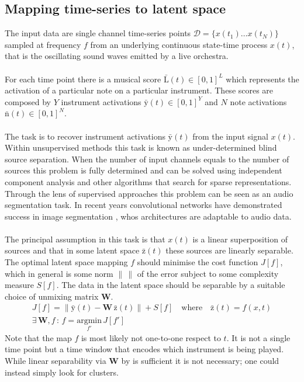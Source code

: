 \documentclass{article}[12pt]
\numberwithin{equation}{section}
\begin{document}
\subsection{Mapping time-series to latent space}
The input data are single channel time-series points $\mathcal{D}=\{x(t_1)\dots
x(t_N)\}$ sampled at frequency $f$ from an underlying continuous state-time
process $x(t)$, that is the oscillating sound waves emitted by a live orchestra.
\\\\
For each time point there is a musical score $\bar{\mathrm{L}}(t)\in[0,1]^L$ which
represents the activation of a particular note on a particular instrument. These scores
are composed by $Y$ instrument activations $\bar{\mathrm{y}}(t)\in[0,1]^Y$ and $N$
note activations $\bar{\mathrm{n}}(t)\in[0,1]^N$.
\\\\
The task is to recover instrument activations $\bar{\mathrm{y}}(t)$ from
the input signal $x(t)$. Within unsupervised methods this task is known as
under-determined blind source separation. When the number of input channels
equals to the number of sources this problem is fully determined and can be
solved using independent component analysis
\cite{Platt1995Information-MaximizationDeconvolution} and other algorithms
that search for sparse representations. Through the lens of supervised approaches
this problem can be seen as an audio segmentation task. In recent years
convolutional networks have demonstrated success in image segmentation \cite{},
whos architectures are adaptable to audio data.
\\\\
The principal assumption in this task is that $x(t)$ is a linear superposition
of sources and that in some latent space $\bar{\mathrm{z}}(t)$ these sources are
linearly separable. The optimal latent space mapping $f$ should minimise the
cost function $J[f]$, which in general is some norm $\left\lVert\,\right\rVert$
of the error subject to some complexity measure $S[f]$. The data in the latent
space should be separable by a suitable choice of unmixing matrix $\mathbf{W}$.
\begin{align}
	J[f]=\left\lVert\bar{\mathrm{y}}(t)-\mathbf{W}\,\bar{\mathrm{z}}(t)\right\rVert+S[f]
	\quad\text{where}\quad
	\bar{\mathrm{z}}(t) = f(x,t)\\
	\exists\,\mathbf{W},f\,:\,f=\underset{f'}{\mathrm{argmin}}\,J[f']
	\qquad\qquad\qquad
\end{align}
Note that the map $f$ is most likely not one-to-one respect to $t$. It is not a
single time point but a time window that encodes which instrument is being
played. While linear separability via $\mathbf{W}$ by is sufficient it is not
necessary; one could instead simply look for clusters.
\end{document}
